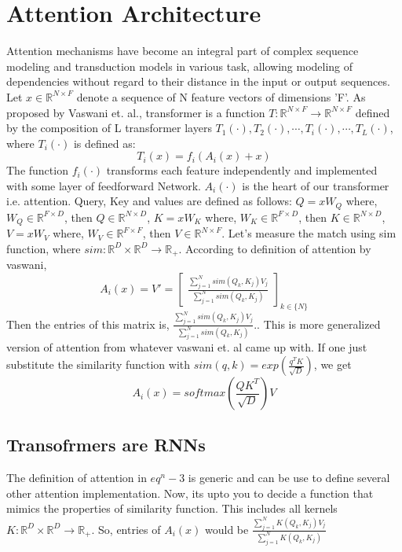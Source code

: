 \documentclass{article}
\newcommand{\R}{\mathbb{R}}
\begin{document}
\section{Attention Architecture}
    Attention mechanisms have become an integral part of complex sequence modeling and transduction models in various task, allowing modeling of dependencies without regard to their distance in the input or output sequences.
    Let $x \in \R^{N \times F}$ denote a sequence of N feature vectors of dimensions 'F'. As proposed by Vaswani et. al., transformer is a function $T: \R^{N \times F} \rightarrow \R^{N \times F}$ defined by the composition of L transformer layers $T_1(\cdot),T_2(\cdot),\cdots,T_i(\cdot),\cdots,T_L(\cdot)$, where $T_i(\cdot)$
    is defined as:
    \begin{equation}
        T_i(x)=f_i(A_i(x)+x)
    \end{equation}
    The function $f_i(\cdot)$ transforms each feature independently and implemented with some layer of feedforward Network. $A_i(\cdot)$ is the heart of our transformer i.e. attention. 
    Query, Key and values are defined as follows:
    $Q=xW_Q$  where, $W_Q \in \R^{F \times D}$, then $Q \in \R^{N \times D}$, $K=xW_K$  where, $W_K \in \R^{F \times D}$, then $K \in \R^{N \times D}$, $V=xW_V$  where, $W_V \in \R^{F \times F}$, then $V \in \R^{N \times F}$.
    Let's measure the match using sim function, where $sim: \R^D \times \R^D \rightarrow \R_+$.
    According to definition of attention by vaswani,
    \begin{equation}
        A_i(x)=V'=\begin{bmatrix}
            \frac{\sum_{j=1}^{N}sim(Q_k,K_j)V_j}{\sum_{j=1}^{N}sim(Q_k,K_j)}
        \end{bmatrix}_{k \in \{N\}}
    \end{equation}
    Then the entries of this matrix is, $ \frac{\sum_{j=1}^{N}sim(Q_k,K_j)V_j}{\sum_{j=1}^{N}sim(Q_k,K_j)}.$. This is more generalized version of attention from whatever vaswani et. al came up with. If one just substitute the similarity function with $sim(q,k)=exp(\frac{q^TK}{\sqrt{D}})$, we get
    \begin{equation}
        A_i(x)=softmax(\frac{QK^T}{\sqrt{D}})V
    \end{equation}
    
\subsection{Transofrmers are RNNs}
The definition of attention in $eq^{n}-3$ is generic and can be use to define several other attention implementation. Now, its upto you to decide a function that mimics the properties of similarity function. This includes all kernels $K: \R^{D} \times \R^{D} \rightarrow \R_+$. So, entries of $A_i(x)$ would be $
            \frac{\sum_{j=1}^{N}K(Q_k,K_j)V_j}{\sum_{j=1}^{N}K(Q_k,K_j)}$
       
\end{document}
